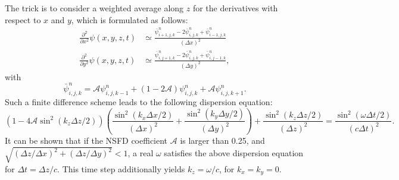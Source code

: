 The trick is to consider a weighted average along $z$ for the derivatives with respect to $x$ and $y$, which is formulated as follows:
%
\begin{align}
\frac{\partial^{2}}{\partial x^{2}} \psi(x,y,z,t) & \simeq \frac{\bar{\psi}_{i+1,j,k}^n-2\bar{\psi}_{i,j,k}^n+\bar{\psi}_{i-1,j,k}^n}{(\Delta x)^2}
\\
\frac{\partial^{2}}{\partial y^{2}} \psi(x,y,z,t) & \simeq \frac{\bar{\psi}_{i,j+1,k}^n-2\bar{\psi}_{i,j,k}^n+\bar{\psi}_{i,j-1,k}^n}{(\Delta y)^2},
\end{align}
%
with
%
\begin{equation}
\label{NSFDtrick}
\bar{\psi}_{i,j,k}^n = \mathcal{A} \psi_{i,j,k-1}^n + (1-2\mathcal{A}) \psi_{i,j,k}^n + \mathcal{A} \psi_{i,j,k+1}^n.
\end{equation}
%
Such a finite difference scheme leads to the following dispersion equation:
%
\begin{equation}
\label{NSFDDispersionCD}
\left( 1 - 4 \mathcal{A} \sin^2(k_z\Delta z/2) \right) \left( \frac{\sin^2(k_x\Delta x/2)}{(\Delta x)^2} + \frac{\sin^2(k_y\Delta y/2)}{(\Delta y)^2} \right) + \frac{\sin^2(k_z\Delta z/2)}{(\Delta z)^2} = \frac{\sin^2(\omega \Delta t/2)}{(c\Delta t)^2}.
\end{equation}
%
It can be shown that if the NSFD coefficient $\mathcal{A}$ is larger than 0.25, and $\sqrt{(\Delta z/\Delta x)^2+ (\Delta z/\Delta y)^2} < 1$, a real $\omega$ satisfies the above dispersion equation for $\Delta t = \Delta z / c$.
%
This time step additionally yields $k_z=\omega/c$, for $k_x=k_y=0$.


